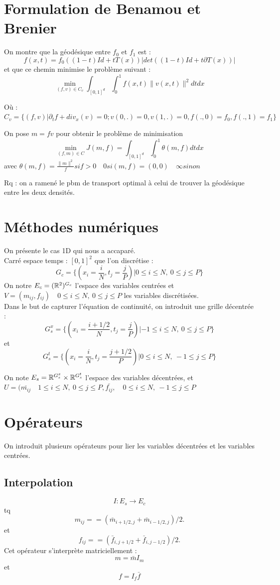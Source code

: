 \documentclass[a4paper,12pt]{article}
\begin{document}
\section{Formulation de Benamou et Brenier}
On montre que la géodésique entre $f_0$ et $f_1$ est : 
$$
f(x,t)=f_0((1-t)Id+tT(x))|det((1-t)Id+t\partial T(x))|
$$
et que ce chemin minimise le problème suivant : 
$$
\min_{(f,v)\in C_v} \int_{[0,1]^d}\int_0^1 f(x,t)\|v(x,t)\|^2dtdx
$$

Où : $C_v= \{(f,v)|\partial_t f+div_x(v)=0;v(0,.)=0,v(1,.)=0,f(.,0)=f_0,f(.,1)=f_1\}$

On pose $m = fv$ pour obtenir le problème de minimisation 
$$
\min_{(f,m)\in C}J(m,f)=\int_{[0,1]^d}\int_0^1 \theta (m,f)dtdx
$$
avec $\theta (m,f) = \frac{\|m\|^2}{f} si f>0 \quad 0 si (m,f)=(0,0)\quad \infty sinon$

Rq : on a ramené le pbm de transport optimal à celui de trouver la géodésique entre les deux densités. 
\section{Méthodes numériques}
On présente le cas 1D qui nous a accaparé. \\
Carré espace temps : $[0,1]^2$ que l'on discrétise : 
$$
G_c = \{(x_i=\frac{i}{N},t_j=\frac{j}{P})|0\leq i\leq N,\ 0\leq j\leq P\}
$$
On notre $E_c =(\mathbb{R}^2)^{G_c}$ l'espace des variables centrées et $ V=(m_{ij},f_{ij}) \quad 0\leq i\leq N,\ 0\leq j\leq P$ les variables discrétisées. \\

Dans le but de capturer l'équation de continuité, on introduit une grille décentrée : 
$$
G_s^x = \{(x_i=\frac{i+1/2}{N},t_j=\frac{j}{P})|-1\leq i\leq N,\ 0\leq j\leq P\}
$$
et 
$$
G_s^t = \{(x_i=\frac{i}{N},t_j=\frac{j+1/2}{P})|0\leq i\leq N,\ -1\leq j\leq P\}
$$

On note $E_s=\mathbb{R}^{G_s^x}\times\mathbb{R}^{G_s^t}$ l'espace des variables décentrées, et $U=(\bar{m_{ij}}\quad 1\leq i\leq N,\ 0\leq j\leq P,\bar{f_{ij}},\quad 0\leq i\leq N,\ -1\leq j\leq P$


\section{Opérateurs}
On introduit plusieurs opérateurs pour lier les variables décentrées et les variables centrées.
\subsection{Interpolation}
$$
I:E_s \rightarrow E_c
$$
tq 
$$
m_{ij} = = (\bar{m}_{i+1/2,j}+\bar{m}_{i-1/2,j})/2.
$$
et
$$
f_{ij} = = (\bar{f}_{i,j+1/2}+\bar{f}_{i,j-1/2})/2.
$$
Cet opérateur s'interprète matriciellement : 
$$
m = \bar{m}I_m
$$
et 
$$
f = I_f\bar{f}
$$
\end{document}
